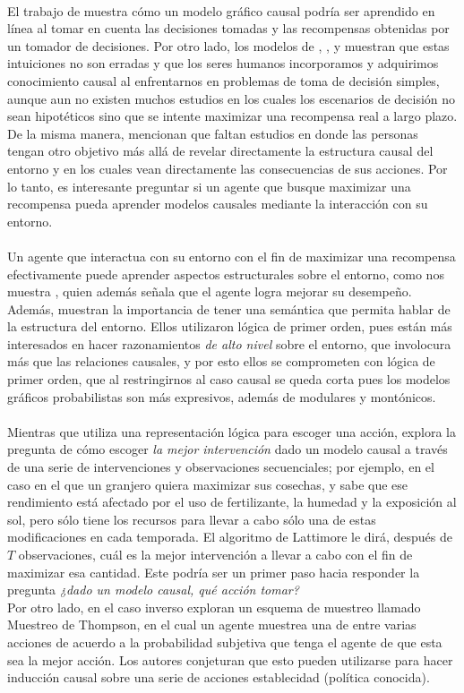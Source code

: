 \documentclass[11pt]{article}
\theoremstyle{plain}
\begin{document}
\\
El trabajo de \cite{wellen2012learning} muestra cómo un modelo gráfico causal podría ser aprendido en línea al tomar en cuenta las decisiones tomadas y las recompensas obtenidas por un tomador de decisiones. Por otro lado, los modelos de \cite{sloman2006causal}, \cite{meder2008inferring}, \cite{hagmayer2009decision} y \cite{hagmayer2013repeated} muestran que estas intuiciones no son erradas y que los seres humanos incorporamos y adquirimos conocimiento causal al enfrentarnos en problemas de toma de decisión simples, aunque aun no existen muchos estudios en los cuales los escenarios de decisión no sean hipotéticos sino que se intente maximizar una recompensa real a largo plazo. De la misma manera, \cite{hagmayer2013repeated} mencionan que faltan estudios en donde las personas tengan otro objetivo más allá de revelar directamente la estructura causal del entorno y en los cuales vean directamente las consecuencias de sus acciones. Por lo tanto, es interesante preguntar si un agente que busque maximizar una recompensa pueda aprender modelos causales mediante la interacción con su entorno.\\
\\
Un agente que interactua con su entorno con el fin de maximizar una recompensa efectivamente puede aprender aspectos estructurales sobre el entorno, como nos muestra \cite{garnelo2016towards}, quien además señala que el agente logra mejorar su desempeño. Además, muestran la importancia de tener una semántica que permita hablar de la estructura del entorno. Ellos utilizaron lógica de primer orden, pues están más interesados en hacer razonamientos \textit{de alto nivel} sobre el entorno, que involocura más que las relaciones causales, y por esto ellos se comprometen con lógica de primer orden, que al restringirnos al caso causal se queda corta pues los modelos gráficos probabilistas son más expresivos, además de modulares y montónicos.\\
\\
Mientras que \cite{garnelo2016towards} utiliza una representación lógica para escoger una acción, \cite{lattimoreNIPS2016} explora la pregunta de cómo escoger \textit{la mejor intervención} dado un modelo causal a través de una serie de intervenciones y observaciones secuenciales; por ejemplo, en el caso en el que un granjero quiera maximizar sus cosechas, y sabe que ese rendimiento está afectado por el uso de fertilizante, la humedad y la exposición al sol, pero sólo tiene los recursos para llevar a cabo sólo una de estas modificaciones en cada temporada. El algoritmo de Lattimore le dirá, después de $T$ observaciones, cuál es la mejor intervención a llevar a cabo con el fin de maximizar esa cantidad. Este podría ser un primer paso hacia responder la pregunta \textit{¿dado un modelo causal, qué acción tomar?}
\\
Por otro lado, en el caso inverso \cite{ortega2014generalized} exploran un esquema de muestreo llamado Muestreo de Thompson, en el cual un agente muestrea una de entre varias acciones de acuerdo a la probabilidad subjetiva que tenga el agente de que esta sea la mejor acción. Los autores conjeturan que esto pueden utilizarse para hacer inducción causal sobre una serie de acciones establecidad (política conocida).
\end{document}
